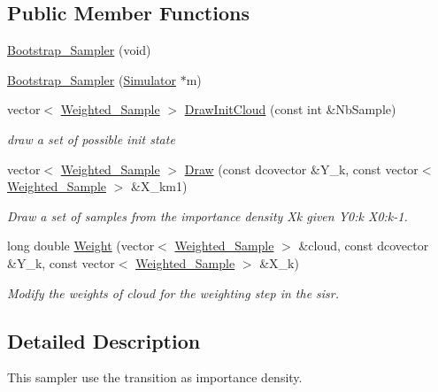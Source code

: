 \subsection*{Public Member Functions}
\begin{CompactItemize}
\item 
\hyperlink{class_bootstrap___sampler_bf03144ecc96fdc63267d050ed91e71b}{Bootstrap\_\-Sampler} (void)
\item 
\hyperlink{class_bootstrap___sampler_484a287a562f6f3801d5547cfff0b757}{Bootstrap\_\-Sampler} (\hyperlink{class_simulator}{Simulator} $\ast$m)
\item 
vector$<$ \hyperlink{class_weighted___sample}{Weighted\_\-Sample} $>$ \hyperlink{class_bootstrap___sampler_e36eb9258b052c41e075b350960d21a3}{DrawInitCloud} (const int \&NbSample)
\begin{CompactList}\small\item\em draw a set of possible init state \item\end{CompactList}\item 
vector$<$ \hyperlink{class_weighted___sample}{Weighted\_\-Sample} $>$ \hyperlink{class_bootstrap___sampler_a826164a46c257f5a95ba0b4eba7ee83}{Draw} (const dcovector \&Y\_\-k, const vector$<$ \hyperlink{class_weighted___sample}{Weighted\_\-Sample} $>$ \&X\_\-km1)
\begin{CompactList}\small\item\em Draw a set of samples from the importance density Xk given Y0:k X0:k-1. \item\end{CompactList}\item 
long double \hyperlink{class_bootstrap___sampler_22ca201b958c0c873cfdbd1d545140dc}{Weight} (vector$<$ \hyperlink{class_weighted___sample}{Weighted\_\-Sample} $>$ \&cloud, const dcovector \&Y\_\-k, const vector$<$ \hyperlink{class_weighted___sample}{Weighted\_\-Sample} $>$ \&X\_\-k)
\begin{CompactList}\small\item\em Modify the weights of cloud for the weighting step in the sisr. \item\end{CompactList}\end{CompactItemize}


\subsection{Detailed Description}
This sampler use the transition as importance density. 



